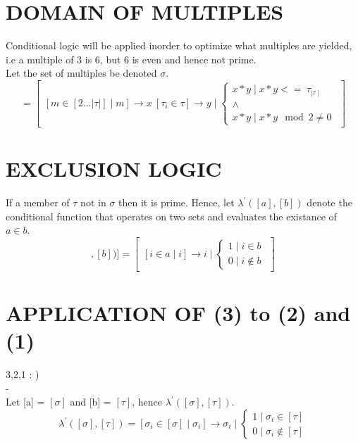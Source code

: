 \documentclass[11pt]{article}
\begin{document}
\section{DOMAIN OF MULTIPLES}
Conditional logic will be applied inorder to optimize what multiples are yielded, i.e a multiple of 3 is 6, but 6 is even and hence not
prime.\\
Let the set of multiples be denoted $\sigma$.
\begin{equation}[\sigma]=\begin{bmatrix}[m\in[2...|\tau|]\mid m]\rightarrow x\ [\tau_i\in\tau]\rightarrow y\mid\begin{cases}x*y\mid x*y <= \ 
\tau_{\mid\tau\mid}\\ \land\\x*y\mid x*y \mod 2 \not = 0\end{cases}\end{bmatrix}\end{equation}
\section{EXCLUSION LOGIC}
If a member of $\tau$ not in $\sigma$ then it is prime.
Hence, let $\lambda^\prime([a],[b])$ denote the conditional function that operates on two sets and evaluates the existance of $a\in b$.
\begin{equation}[\lambda^\prime([a],[b])] =\begin{bmatrix} [i \in a\mid i]\rightarrow i \mid\begin{cases}1 \mid i \in b\\ 0 \mid i 
\not\in b\end{cases}\end{bmatrix}\end{equation}

\section{APPLICATION OF (3) to (2) and (1)}
{\color{red}3,2,1 : )}\\
{\color{white}-}
\\
Let [a] = $[\sigma]$ and [b] = $[\tau]$, hence $\lambda^\prime([\sigma],[\tau])$.
\begin{equation} \lambda^\prime([\sigma],[\tau])= [\sigma_i\in[\sigma]\mid\sigma_i]\rightarrow\sigma_i\mid
\begin{cases}1 \mid \sigma_i \in [\tau]\\ 0 \mid \sigma_i \not\in [\tau]\end{cases} \end{equation}
\end{document}
